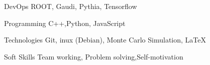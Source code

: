 

\begin{cvskills}

  \cvskill
    {DevOps} %
    {ROOT, Gaudi, Pythia, Tensorflow} %


  \cvskill
    {Programming} %
    {C++,Python, JavaScript} %

  \cvskill
    {Technologies} %
    {Git, inux (Debian), Monte Carlo Simulation, \LaTeX} %

      \cvskill
    {Soft Skills} %
    {Team working, Problem solving,Self-motivation} %


\end{cvskills}
